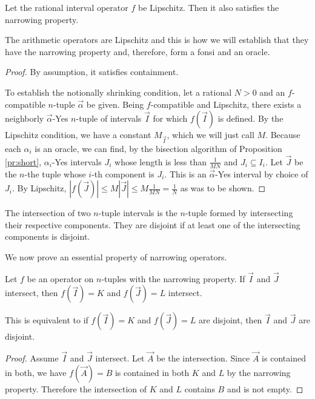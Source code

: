 \documentclass[12pt]{article}
\begin{document}
\begin{proposition}
    Let the rational interval operator $f$ be Lipschitz. Then it also satisfies the narrowing property. 
\end{proposition}

The arithmetic operators are Lipschitz and this is how we will establish that they have the narrowing property and, therefore, form a fonsi and an oracle. 

\begin{proof}
    By assumption, it satisfies containment. 

    To establish the notionally shrinking condition, let a rational $N >0$ and an $f$-compatible  $n$-tuple $\vec{\alpha}$ be given. Being $f$-compatible and Lipschitz, there exists a neighborly $\vec{\alpha}$-Yes $n$-tuple of intervals $\vec{I}$ for which $f(\vec{I})$ is defined. By the Lipschitz condition, we have a constant $M_{\vec{I}}$, which we will just call $M$. Because each $\alpha_i$ is an oracle, we can find, by the bisection algorithm of Proposition \ref{pr:short}, $\alpha_i$-Yes intervals $J_i$ whose length is less than $\frac{1}{MN}$ and $J_i \subseteq I_i$. Let $\vec{J}$ be the $n$-the tuple whose $i$-th component is $J_i$. This is an $\vec{\alpha}$-Yes interval by choice of $J_i$. By Lipschitz, $|f(\vec{J})| \leq M |\vec{J}| \leq M \frac{1}{MN} = \frac{1}{N}$ as was to be shown. 
\end{proof}


The intersection of two $n$-tuple intervals is the $n$-tuple formed by intersecting their respective components. They are disjoint if at least one of the intersecting components is disjoint. 

We now prove an essential property of narrowing operators. 

\begin{proposition} \label{pr:op-nrw}
Let $f$ be an operator on $n$-tuples with the narrowing property. If $\vec{I}$ and $\vec{J}$ intersect, then $f(\vec{I})=K$ and $f(\vec{J}) = L$ intersect.
\end{proposition}

This is equivalent to if $f(\vec{I})=K$ and $f(\vec{J}) = L$ are disjoint, then $\vec{I}$ and $\vec{J}$ are disjoint.

\begin{proof}
Assume $\vec{I}$ and $\vec{J}$ intersect. Let $\vec{A}$ be the intersection. Since $\vec{A}$ is contained in both, we have $f(\vec A)= B$ is contained in both $K$ and $L$ by the narrowing property. Therefore the intersection of $K$ and $L$ contains $B$ and is not empty.  
\end{proof}
\end{document}

